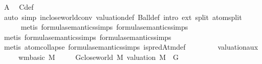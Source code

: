 \begin{isabellebody}
\ A\ \isamarkupfalse%
\ C{\isacharunderscore}{\kern0pt}def\isanewline
\ \ \ \ \isamarkupfalse%
\ {\isacharparenleft}{\kern0pt}auto\ simp{\isacharcolon}{\kern0pt}\ in{\isacharunderscore}{\kern0pt}close{\isacharunderscore}{\kern0pt}world{\isacharunderscore}{\kern0pt}conv\ valuation{\isacharunderscore}{\kern0pt}def\ Ball{\isacharunderscore}{\kern0pt}def\ intro{\isacharbang}{\kern0pt}{\isacharcolon}{\kern0pt}\ ext\ split{\isacharcolon}{\kern0pt}\ atom{\isachardot}{\kern0pt}split{\isacharparenright}{\kern0pt}\isanewline
\ \ \ \ \isamarkupfalse%
\ {\isacharparenleft}{\kern0pt}metis\ formula{\isacharunderscore}{\kern0pt}semantics{\isachardot}{\kern0pt}simps{\isacharparenleft}{\kern0pt}{}{\isacharparenright}{\kern0pt}\ formula{\isacharunderscore}{\kern0pt}semantics{\isachardot}{\kern0pt}simps{\isacharparenleft}{\kern0pt}{}{\isacharparenright}{\kern0pt}{\isacharparenright}{\kern0pt}\isanewline
\ \ \ \ \isamarkupfalse%
\ {\isacharparenleft}{\kern0pt}metis\ formula{\isacharunderscore}{\kern0pt}semantics{\isachardot}{\kern0pt}simps{\isacharparenleft}{\kern0pt}{}{\isacharparenright}{\kern0pt}\ formula{\isacharunderscore}{\kern0pt}semantics{\isachardot}{\kern0pt}simps{\isacharparenleft}{\kern0pt}{}{\isacharparenright}{\kern0pt}{\isacharparenright}{\kern0pt}\isanewline
\ \ \ \ \isamarkupfalse%
\ {\isacharparenleft}{\kern0pt}metis\ atom{\isachardot}{\kern0pt}collapse{\isacharparenleft}{\kern0pt}{}{\isacharparenright}{\kern0pt}\ formula{\isacharunderscore}{\kern0pt}semantics{\isachardot}{\kern0pt}simps{\isacharparenleft}{\kern0pt}{}{\isacharparenright}{\kern0pt}\ is{\isacharunderscore}{\kern0pt}predAtm{\isacharunderscore}{\kern0pt}def{\isacharparenright}{\kern0pt}\isanewline
\ \ \ \ \isamarkupfalse%
%
\endisatagproof
{\isafoldproof}%
%
\isadelimproof
\isanewline
%
\endisadelimproof
\isanewline
\ \ \isamarkupfalse%
\ valuation{\isacharunderscore}{\kern0pt}aux{\isacharunderscore}{\kern0pt}{}{\isacharcolon}{\kern0pt}\isanewline
\ \ \ \ \ {\isachardoublequoteopen}wm{\isacharunderscore}{\kern0pt}basic\ M{\isachardoublequoteclose}\isanewline
\ \ \ \ \ {\isachardoublequoteopen}{\isacharparenleft}{\kern0pt}{\isasymforall}G{\isasymin}close{\isacharunderscore}{\kern0pt}world\ M{\isachardot}{\kern0pt}\ valuation\ M\ {\isasymTurnstile}\ G{\isacharparenright}{\kern0pt}{\isachardoublequoteclose}\isanewline
%
\isadelimproof

\end{isabellebody}
